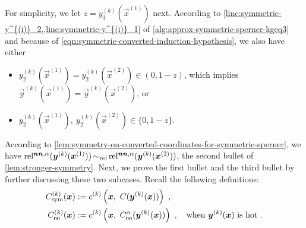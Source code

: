 For simplicity, we let $z=y^{(k)}_3(\vec{x}^{(1)})$ next. 
According to \cref{line:symmetric-y^{(i)}_2,,line:symmetric-y^{(i)}_1} of \cref{alg:approx-symmetric-sperner-kgeq3} and
because of \cref{eqn:symmetric-converted-induction-hypothesis}, we also have either 
\begin{itemize}[itemsep=0em,topsep=0.5em]
    \item $y^{(k)}_2(\vec{x}^{(1)}) = y^{(k)}_2(\vec{x}^{(2)})\in (0,1-z)$, which implies $\vec{y}^{(k)}(\vec{x}^{(1)}) = \vec{y}^{(k)}(\vec{x}^{(2)})$, or 
    \item $y^{(k)}_2(\vec{x}^{(1)}),\ y^{(k)}_2(\vec{x}^{(2)}) \in \{0,1-z\}$.
\end{itemize} 
According to \cref{lem:symmetry-on-converted-coordinates-for-symmetric-sperner}, we have $\operatorname*{rel^{\boldsymbol{nn},\alpha}}(\boldsymbol{y}^{(k)}(\boldsymbol{x}^{(1)})) \operatorname*{\sim_{\rm rel}} \operatorname*{rel^{\boldsymbol{nn},\alpha}}(\boldsymbol{y}^{(k)}(\boldsymbol{x}^{(2)}))$, the second bullet of \cref{lem:stronger-symmetry}. 
Next, we prove the first bullet and the third bullet by further discussing these two subcases.
Recall the following definitions:
\begin{align*}
    \Csym{k}(\vec{x}) &:= c^{(k)}\left(\vec{x},\ C(\vec{y}^{(k)}(\vec{x}))\right)~,
    \\
    C_{\sf nn}^{(k)}(\vec{x}) &:= c^{(k)}\left(\vec{x},\ C_{\sf nn}^{\alpha}(\vec{y}^{(k)}(\vec{x}))\right)~, \quad \text{when $\vec{y}^{(k)}(\vec{x})$ is hot}~.
\end{align*}

